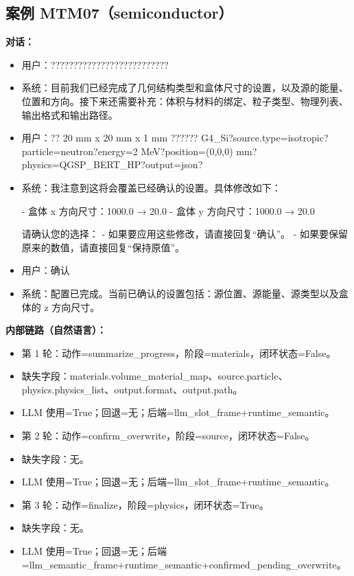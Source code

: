 \documentclass[11pt]{ctexart}
\begin{document}
\subsection{案例 MTM07（semiconductor）}
\textbf{对话：}
\begin{itemize}
\item 用户：??????????????????????????
\item 系统：目前我们已经完成了几何结构类型和盒体尺寸的设置，以及源的能量、位置和方向。接下来还需要补充：体积与材料的绑定、粒子类型、物理列表、输出格式和输出路径。
\item 用户：?? 20 mm x 20 mm x 1 mm ?????? G4\_Si?source.type=isotropic?particle=neutron?energy=2 MeV?position=(0,0,0) mm?physics=QGSP\_BERT\_HP?output=json?
\item 系统：我注意到这将会覆盖已经确认的设置。具体修改如下：

- 盒体 x 方向尺寸：1000.0 → 20.0
- 盒体 y 方向尺寸：1000.0 → 20.0

请确认您的选择：
- 如果要应用这些修改，请直接回复“确认”。
- 如果要保留原来的数值，请直接回复“保持原值”。
\item 用户：确认
\item 系统：配置已完成。当前已确认的设置包括：源位置、源能量、源类型以及盒体的 z 方向尺寸。
\end{itemize}
\textbf{内部链路（自然语言）：}
\begin{itemize}
\item 第 1 轮：动作=summarize\_progress，阶段=materials，闭环状态=False。
\item 缺失字段：materials.volume\_material\_map、source.particle、physics.physics\_list、output.format、output.path。
\item LLM 使用=True；回退=无；后端=llm\_slot\_frame+runtime\_semantic。
\item 第 2 轮：动作=confirm\_overwrite，阶段=source，闭环状态=False。
\item 缺失字段：无。
\item LLM 使用=True；回退=无；后端=llm\_slot\_frame+runtime\_semantic。
\item 第 3 轮：动作=finalize，阶段=physics，闭环状态=True。
\item 缺失字段：无。
\item LLM 使用=True；回退=无；后端=llm\_semantic\_frame+runtime\_semantic+confirmed\_pending\_overwrite。
\end{itemize}
\end{document}
